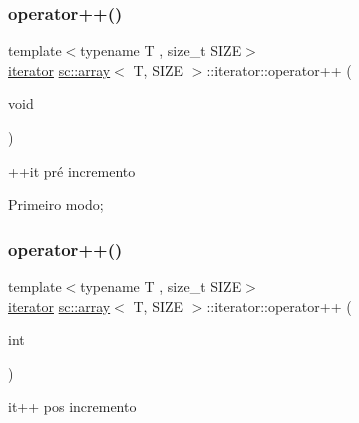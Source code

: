 \subsubsection{\texorpdfstring{operator++()}{operator++()}\hspace{0.1cm}{\footnotesize\ttfamily [1/2]}}
{\footnotesize\ttfamily template$<$typename T , size\+\_\+t S\+I\+ZE$>$ \\
\hyperlink{classsc_1_1array_1_1iterator}{iterator} \hyperlink{classsc_1_1array}{sc\+::array}$<$ T, S\+I\+ZE $>$\+::iterator\+::operator++ (\begin{DoxyParamCaption}\item[{void}]{ }\end{DoxyParamCaption})\hspace{0.3cm}{\ttfamily [inline]}}



++it pré incremento 

Primeiro modo; \mbox{\label{classsc_1_1array_1_1iterator_a083298121c2b04aadd273763fb9db65f}} 
\subsubsection{\texorpdfstring{operator++()}{operator++()}\hspace{0.1cm}{\footnotesize\ttfamily [2/2]}}
{\footnotesize\ttfamily template$<$typename T , size\+\_\+t S\+I\+ZE$>$ \\
\hyperlink{classsc_1_1array_1_1iterator}{iterator} \hyperlink{classsc_1_1array}{sc\+::array}$<$ T, S\+I\+ZE $>$\+::iterator\+::operator++ (\begin{DoxyParamCaption}\item[{int}]{ }\end{DoxyParamCaption})\hspace{0.3cm}{\ttfamily [inline]}}



it++ pos incremento 

\mbox{\label{classsc_1_1array_1_1iterator_a75ad3e03c3fa61baef586f5f2486ecd8}} 
